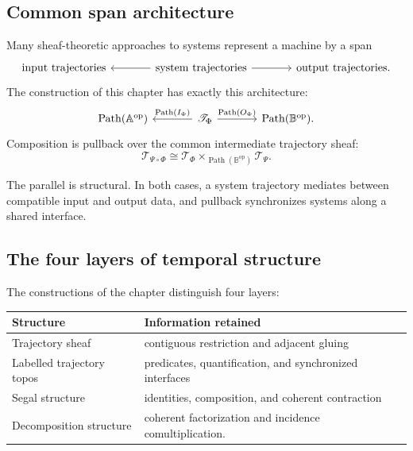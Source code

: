 \subsection{Common span architecture}
\label{subsec:common-span-architecture}

Many sheaf-theoretic approaches to systems represent a machine by a span
\[
\begin{tikzcd}[column sep=large]
    \text{input trajectories}
    &
    \text{system trajectories}
        \arrow[l]
        \arrow[r]
    &
    \text{output trajectories}.
\end{tikzcd}
\]
The construction of this chapter has exactly this architecture:
\[
\begin{tikzcd}[column sep=large]
    \operatorname{Path}(\mathbb A^{\mathrm{op}})
    &
    \mathscr T_\Phi
        \arrow[l, "{\operatorname{Path}(I_\Phi)}"']
        \arrow[r, "{\operatorname{Path}(O_\Phi)}"]
    &
    \operatorname{Path}(\mathbb B^{\mathrm{op}}).
\end{tikzcd}
\]
Composition is pullback over the common intermediate trajectory sheaf:
\[
    \mathscr T_{\Psi\circ\Phi}
    \cong
    \mathscr T_\Phi
    \times_{\operatorname{Path}(\mathbb B^{\mathrm{op}})}
    \mathscr T_\Psi.
\]

The parallel is structural. In both cases, a system trajectory mediates
between compatible input and output data, and pullback synchronizes systems
along a shared interface.

\subsection{The four layers of temporal structure}
\label{subsec:four-layers-temporal-structure}

The constructions of the chapter distinguish four layers:
\begin{center}
\begin{tabular}{ll}
\textbf{Structure} & \textbf{Information retained} \\
\hline
Trajectory sheaf
& contiguous restriction and adjacent gluing \\
Labelled trajectory topos
& predicates, quantification, and synchronized interfaces \\
Segal structure
& identities, composition, and coherent contraction \\
Decomposition structure
& coherent factorization and incidence comultiplication.
\end{tabular}
\end{center}

